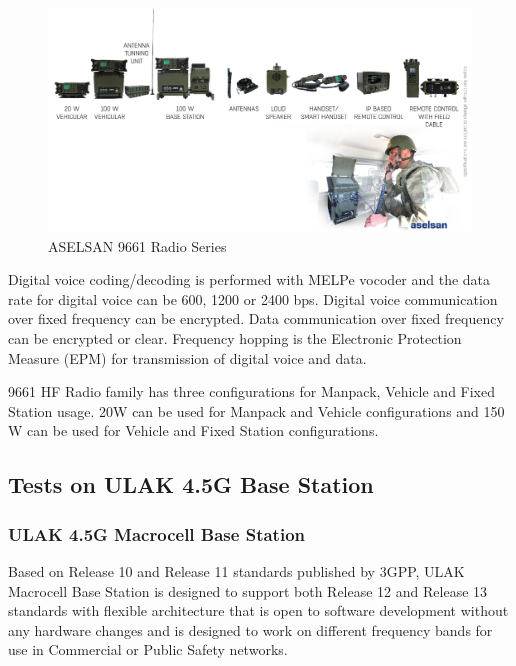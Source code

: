 \begin{figure}[H]
	\center
	\setlength{\unitlength}{\textwidth} 
	\includegraphics[width=1.0\unitlength]{radios}
	\caption{\label{fig:rads}ASELSAN 9661 Radio Series }
\end{figure}

	Digital voice coding/decoding is performed with MELPe vocoder and the data rate for digital voice can be 600, 1200 or 2400 bps. Digital voice communication over fixed frequency can be encrypted. Data communication over fixed frequency can be encrypted or clear. Frequency hopping is the Electronic Protection Measure (EPM) for transmission of digital voice and data.

	9661 HF Radio family has three configurations for Manpack, Vehicle and Fixed Station usage. 20W can be used for Manpack and Vehicle configurations and 150 W can be used for Vehicle and Fixed Station configurations.

\vfill

\subsection{Tests on ULAK 4.5G Base Station  }

\subsubsection{ULAK 4.5G Macrocell Base Station}
\- \indent
	Based on Release 10 and Release 11 standards published by 3GPP, ULAK Macrocell Base Station is designed to support both Release 12 and Release 13 standards with flexible architecture that is open to software development without any hardware changes and is designed to work on different frequency bands for use in Commercial or Public Safety networks.  

